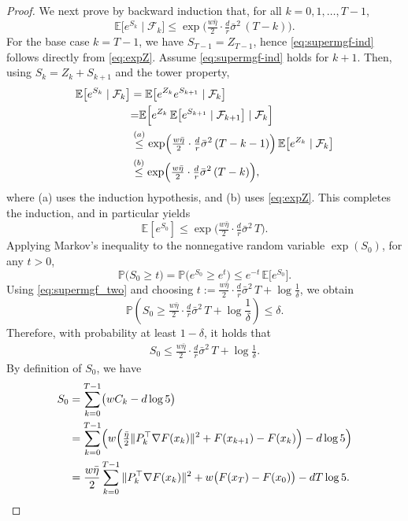 \documentclass[10pt]{article}
\begin{document}
\begin{proof}
We next prove by backward induction that, for all $k=0,1,\ldots,T-1$,
\begin{equation}
\mathbb{E}\big[e^{S_k}\mid \mathcal{F}_k\big]
\le
\exp\!\Big(\tfrac{w\bar{\eta}}{2}\cdot\tfrac{d}{r}\bar{\sigma}^2\,(T-k)\Big).
\label{eq:supermgf-ind}
\end{equation}
For the base case $k=T-1$, we have $S_{T-1}=Z_{T-1}$, hence \eqref{eq:supermgf-ind}
follows directly from \eqref{eq:expZ}. Assume \eqref{eq:supermgf-ind} holds for $k+1$.
Then, using $S_k=Z_k+S_{k+1}$ and the tower property,
\begin{align}
\mathbb{E}\big[e^{S_k}\mid \mathcal{F}_k\big]
&=
\mathbb{E}\big[e^{Z_k}e^{S_{k+1}}\mid \mathcal{F}_k\big] \notag\\
&{=}
\mathbb{E}\Big[e^{Z_k}\,\mathbb{E}\big[e^{S_{k+1}}\mid \mathcal{F}_{k+1}\big]\mid \mathcal{F}_k\Big] \notag\\
&\overset{(a)}{\le}
\exp\!\Big(\tfrac{w\bar{\eta}}{2}\cdot\tfrac{d}{r}\bar{\sigma}^2\,(T-k-1)\Big)\,
\mathbb{E}\big[e^{Z_k}\mid \mathcal{F}_k\big] \notag\\
&\overset{(b)}{\le}
\exp\!\Big(\tfrac{w\bar{\eta}}{2}\cdot\tfrac{d}{r}\bar{\sigma}^2\,(T-k)\Big),
\notag
\end{align}
where (a) uses the induction hypothesis, and (b) uses \eqref{eq:expZ}. This completes the induction,
and in particular yields
\begin{equation}
\mathbb{E}[e^{S_0}]
\le
\exp\!\Big(\tfrac{w\bar{\eta}}{2}\cdot\tfrac{d}{r}\bar{\sigma}^2\,T\Big).
\label{eq:supermgf_two}
\end{equation}
Applying Markov's inequality to the nonnegative random variable $\exp(S_0)$, for any $t>0$,
\begin{equation}
\mathbb{P}\big(S_0\ge t\big)
=
\mathbb{P}\big(e^{S_0}\ge e^{t}\big)
\le
e^{-t}\,\mathbb{E}\big[e^{S_0}\big].
\label{eq:markov-detail}
\end{equation}
Using \eqref{eq:supermgf_two} and choosing
$t:=\tfrac{w\bar{\eta}}{2}\cdot\tfrac{d}{r}\bar{\sigma}^2\,T+\log\frac{1}{\delta}$, we obtain
\[
\mathbb{P}\!\left(
S_0\ge \tfrac{w\bar{\eta}}{2}\cdot\tfrac{d}{r}\bar{\sigma}^2\,T+\log\frac{1}{\delta}
\right)
\le \delta.
\]
Therefore, with probability at least $1-\delta$, it holds that
\begin{align}
S_0 \le \tfrac{w\bar{\eta}}{2}\cdot\tfrac{d}{r}\bar{\sigma}^2\,T+\log\frac{1}{\delta}.
\label{eq:S0-markov}
\end{align}
By definition of $S_0$, we have
\begin{align*}
S_0
&=\sum_{k=0}^{T-1}\bigl(wC_k-d\log 5\bigr) \\
&=\sum_{k=0}^{T-1}\Bigl(
w\Bigl(\tfrac{\bar{\eta}}{2}\|P_k^\top\nabla F(x_k)\|^2
+F(x_{k+1})-F(x_k)\Bigr)-d\log 5
\Bigr) \\
&=\frac{w\bar{\eta}}{2}\sum_{k=0}^{T-1}\|P_k^\top\nabla F(x_k)\|^2
+w\bigl(F(x_T)-F(x_0)\bigr)
-dT\log 5.
\end{align*}


\end{proof}
\end{document}
